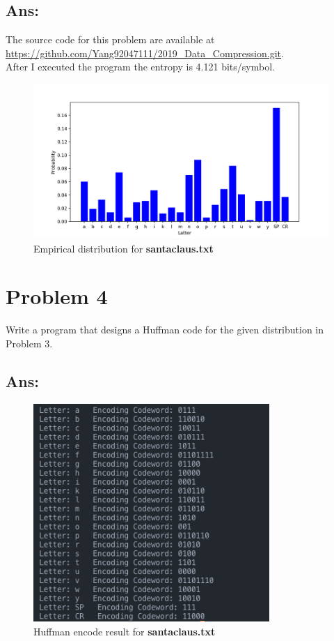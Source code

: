 \documentclass[a4paper, 11pt, oneside]{article} %
\begin{document}
\subsection*{Ans:}

The source code for this problem are available at \\
\url{https://github.com/Yang92047111/2019_Data_Compression.git}.\\
After I executed the program the entropy is 4.121 bits/symbol.

\begin{figure}[h!]
	\centering
	\includegraphics[width=\textwidth]{image/pmf}
	\caption{Empirical distribution for \textbf{santaclaus.txt}}
	\label{fig:empirical-distribution}
\end{figure}

\clearpage

\section*{Problem 4}
Write a program that designs a Huffman code for the given distribution in Problem 3.
\subsection*{Ans:}

\begin{figure}[h!]
	\centering
	\includegraphics[width=0.8\textwidth]{image/huffman_encoding}
	\caption{Huffman encode result for \textbf{santaclaus.txt}}
	\label{fig:encode-result}
\end{figure}
\end{document}
